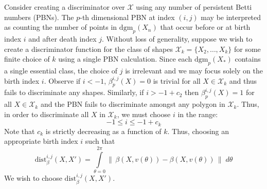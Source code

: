 \documentclass[10pt]{article}
\begin{document}
Consider creating a discriminator over $\mathcal{X}$ using any number of persistent Betti numbers (PBNs). The $p$-th dimensional PBN at index $(i,j)$ may be interpreted as counting the number of points in $\mathrm{dgm}_p(X_n)$ that occur before or at birth index $i$ and after death index $j$. Without loss of generality, suppose we wish to create a discriminator function for the class of shapes $\mathcal{X}_k = \{X_2, \dots, X_k \}$ for some finite choice of $k$ using a single PBN calculation. Since each $\mathrm{dgm}_p(X_\ast)$ contains a single essential class, the choice of $j$ is irrelevant and we may focus solely on the birth index $i$. Observe if $i < -1$, $\beta_p^{i,j}(X) = 0$ is trivial for all $X \in \mathcal{X}_k$ and thus fails to discriminate any shapes. Similarly, if $i > -1 + c_2$ then $\beta_p^{i,j}(X) = 1$ for all $X \in \mathcal{X}_k$ and the PBN fails to discriminate amongst any polygon in $\mathcal{X}_k$. Thus, in order to discriminate all $X$ in $\mathcal{X}_k$, we must choose $i$ in the range: 
$$
-1 \leq i \leq -1 + c_k
$$
Note that $c_k$ is strictly decreasing as a function of $k$. Thus, choosing an appropriate birth index $i$ such that 
$$ \mathrm{dist}_{\beta}^{i,j}(X, X') = \int\limits_{\theta=0}^{2\pi} \lVert \, \beta(X, v(\theta)) - \beta(X, v(\theta)) \, \rVert \; d\theta $$
We wish to choose $\mathrm{dist}_{\beta}^{i,j}(X, X')$.
 
\end{document}
